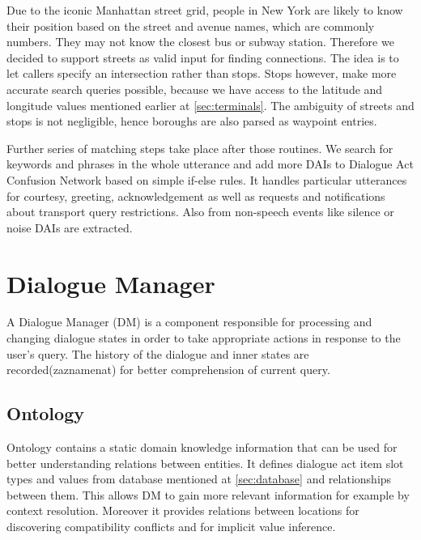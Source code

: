 Due to the iconic Manhattan street grid, people in New York are likely to know their position based on the street and avenue names, which are commonly numbers.
They may not know the closest bus or subway station.
Therefore we decided to support streets as valid input for finding connections.
The idea is to let callers specify an intersection rather than stops. Stops however, make more accurate search queries possible, because we have access to the latitude and longitude values mentioned earlier at \ref{sec:terminals}.
The ambiguity of streets and stops is not negligible, hence boroughs are also parsed as waypoint entries.

Further series of matching steps take place after those routines.
We search for keywords and phrases in the whole utterance and add more DAIs to Dialogue Act Confusion Network based on simple if-else rules.
It handles particular utterances for courtesy, greeting, acknowledgement as well as requests and notifications about transport query restrictions.
Also from non-speech events like silence or noise DAIs are extracted. %

\section{Dialogue Manager}

A Dialogue Manager (DM) is a component responsible for processing and changing dialogue states in order to take appropriate actions in response to the user's query.
The history of the dialogue and inner states are recorded(zaznamenat) for better comprehension of current query.

\subsection{Ontology}

Ontology contains a static domain knowledge information that can be used for better understanding relations between entities.
It defines dialogue act item slot types and values from database mentioned at \ref{sec:database} and relationships between them.
This allows DM to gain more relevant information for example by context resolution.
Moreover it provides relations between locations for discovering compatibility conflicts and for implicit value inference.

